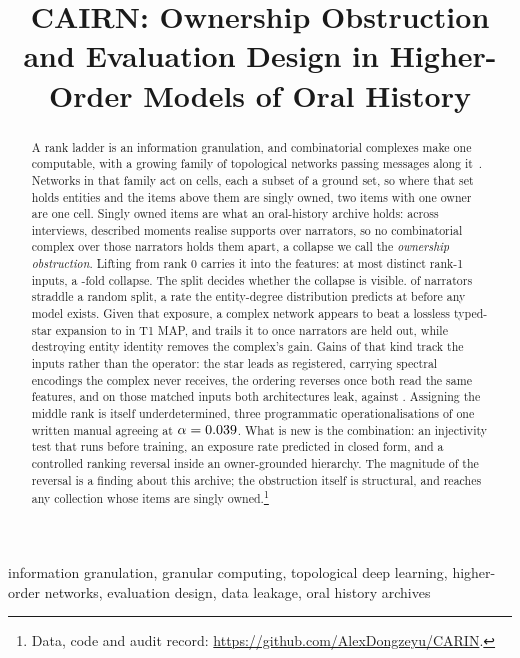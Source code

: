 \documentclass[conference]{IEEEtran}
\title{CAIRN: Ownership Obstruction and Evaluation Design
in Higher-Order Models of Oral History}
\author{\IEEEauthorblockN{Zeyu Dong and Roy Choi}
\IEEEauthorblockA{\textit{Independent Researcher}, Toronto, Canada \\
Correspondence: dongzeyu123@outlook.com}}
\newcommand{\repoURL}{https://github.com/AlexDongzeyu/CARIN}
\begin{document}
\maketitle

\begin{abstract}
A rank ladder is an information granulation, and combinatorial complexes make one
computable, with a growing family
of topological networks passing messages along
it~\citep{hajij2023tdl,papillon2023architectures}. Networks in that family act on cells, each
a subset of a ground set, so where that set holds entities and the items above them are
singly owned, two items with one owner are one cell. Singly owned items are what an
oral-history archive holds: across \nInterviews{}
interviews, \obsCells{} described moments realise \obsDistinct{} supports over
\obsGround{} narrators, so no combinatorial complex over those narrators holds them apart, a
collapse we call the \emph{ownership obstruction}. Lifting from rank 0
carries it into the
features: at most \obsDistinct{} distinct rank-1 inputs, a \obsCollapse{}-fold collapse. The
split
decides whether the collapse is visible. \straddleRandom{} of narrators straddle a random
split, a rate the entity-degree distribution predicts at \exposurePredicted{} before any
model exists. Given that exposure, a complex network appears to beat a lossless typed-star
expansion \MfiveToneRandom{} to \MthreeToneRandom{} in T1 MAP, and trails it \MfiveTone{} to
\MthreeTone{} once narrators are held out, while destroying entity identity removes the
complex's gain. Gains of that kind track the inputs rather than the operator: the star leads as
registered, carrying spectral encodings the complex never receives, the ordering reverses
once both read the same features, and on those matched inputs both architectures leak,
\facExpFivePlain{} against \facExpThreePlain{}.
Assigning the middle rank is itself underdetermined, three programmatic operationalisations
of one written manual agreeing at $\alpha = 0.039{}$. What is new is the combination:
an injectivity test that runs before training, an exposure rate predicted in closed form, and
a controlled ranking reversal inside an owner-grounded
hierarchy. The magnitude of the reversal is a finding about this archive; the obstruction
itself is structural, and reaches any collection whose items are singly owned.\footnote{Data,
code and audit record: \url{\repoURL}.}
\end{abstract}

\begin{IEEEkeywords}
information granulation, granular computing, topological deep learning, higher-order
networks, evaluation design, data leakage, oral history archives
\end{IEEEkeywords}
\end{document}
